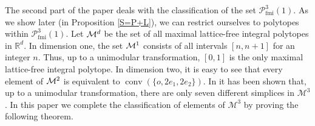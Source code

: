 \documentclass[a4paper]{article}
\theoremstyle{plain}
\begin{document}
The second part of the paper deals with the classification
of the set ${{\mathcal{P}}_{{\mathop{\mathrm{{fmi}}}}}^{{3}}({1})}$.
As we show later (in Proposition \ref{S=P+L}), we can
restrict ourselves to polytopes within ${{\mathcal{P}}_{{\mathop{\mathrm{{fmi}}}}}^{{3}}({1})}$.
Let ${\cal M}^d$ be the set of all maximal lattice-free
integral polytopes in ${\mathbb{R}}^d$.
In dimension one, the set ${\cal M}^1$ consists of all
intervals $[n,n+1]$ for an integer $n$.
Thus, up to a unimodular transformation, $[0,1]$ is the only
maximal lattice-free integral polytope.
In dimension two, it is easy to see that every element of
${\cal M}^2$ is equivalent to ${{\mathop{\mathrm{{conv}}}}}(\{o,2e_1,2e_2\})$.
In \cite{anwawe} it has been shown that, up to a unimodular
transformation, there are only seven different simplices in
${\mathcal{M}^3}$.
In this paper we complete the classification of elements of
${\mathcal{M}^3}$ by proving the following theorem.
\end{document}
